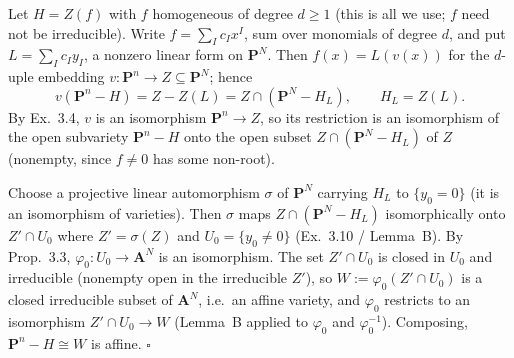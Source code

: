 \documentclass[11pt]{article}
\begin{document}
\pf
Let $H=Z(f)$ with $f$ homogeneous of degree $d\ge1$ (this is all we use; $f$ need not be irreducible). Write $f=\sum_Ic_Ix^I$, sum over monomials of degree $d$, and put $L=\sum_Ic_Iy_I$, a nonzero linear form on $\mathbf P^N$. Then $f(x)=L(v(x))$ for the $d$-uple embedding $v:\mathbf P^n\to Z\subseteq\mathbf P^N$; hence
\[
v(\mathbf P^n-H)=Z-Z(L)=Z\cap(\mathbf P^N-H_L),\qquad H_L=Z(L).
\]
By Ex.~3.4, $v$ is an isomorphism $\mathbf P^n\to Z$, so its restriction is an isomorphism of the open subvariety $\mathbf P^n-H$ onto the open subset $Z\cap(\mathbf P^N-H_L)$ of $Z$ (nonempty, since $f\ne0$ has some non-root).

Choose a projective linear automorphism $\sigma$ of $\mathbf P^N$ carrying $H_L$ to $\{y_0=0\}$ (it is an isomorphism of varieties). Then $\sigma$ maps $Z\cap(\mathbf P^N-H_L)$ isomorphically onto $Z'\cap U_0$ where $Z'=\sigma(Z)$ and $U_0=\{y_0\ne0\}$ (Ex.~3.10 / Lemma~B). By Prop.~3.3, $\varphi_0:U_0\to\mathbf A^N$ is an isomorphism. The set $Z'\cap U_0$ is closed in $U_0$ and irreducible (nonempty open in the irreducible $Z'$), so $W:=\varphi_0(Z'\cap U_0)$ is a closed irreducible subset of $\mathbf A^N$, i.e.\ an affine variety, and $\varphi_0$ restricts to an isomorphism $Z'\cap U_0\to W$ (Lemma~B applied to $\varphi_0$ and $\varphi_0^{-1}$). Composing, $\mathbf P^n-H\cong W$ is affine. \hfill$\square$
\end{document}
